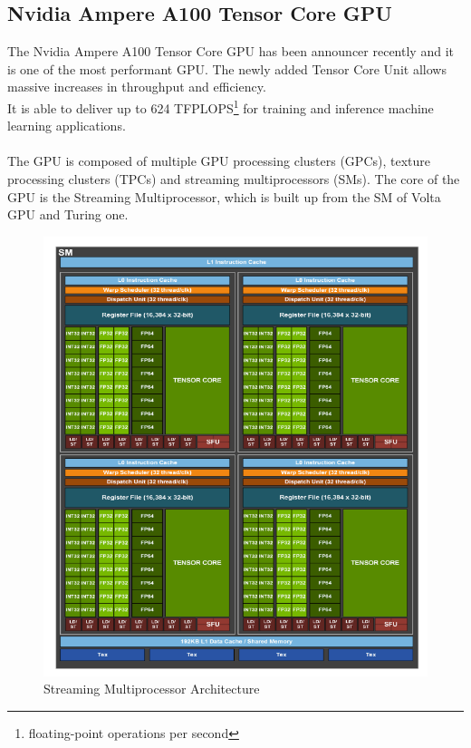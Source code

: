 \subsection{Nvidia Ampere A100 Tensor Core GPU}
The Nvidia Ampere A100 Tensor Core GPU has been announcer recently and it is one of the most performant GPU. The newly added Tensor Core Unit allows massive increases in throughput and efficiency.\\It is able to deliver up to 624 TFPLOPS\footnote{floating-point operations per second} for training and inference machine learning applications.\\\\

The GPU is composed of multiple GPU processing clusters (GPCs), texture processing clusters (TPCs) and streaming multiprocessors (SMs).
The core of the GPU is the Streaming Multiprocessor, which is built up from the SM of Volta GPU and Turing one.
\begin{figure}[!htbp]
\centering
\captionsetup{justification=centering}
\includegraphics[scale=0.6]{./figure/volta_sm_arch.PNG}
\caption{Streaming Multiprocessor Architecture \cite{paper:41}}
\label{fig:voltasmarch}
\end{figure}

